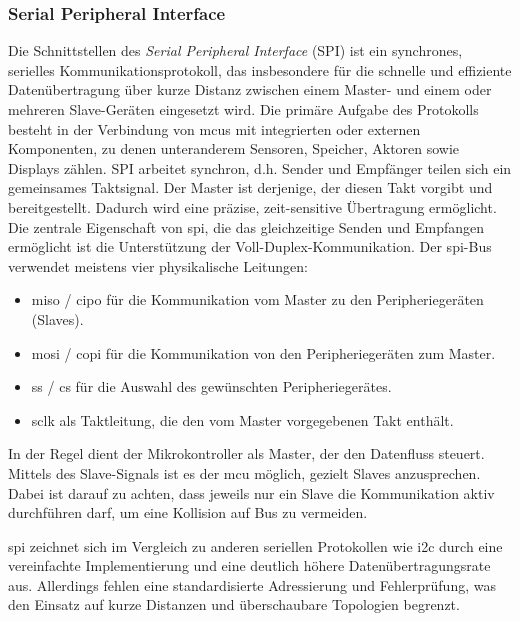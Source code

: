 \subsubsection*{Serial Peripheral Interface}
Die Schnittstellen des \emph{Serial Peripheral Interface} (SPI) ist ein synchrones, serielles Kommunikationsprotokoll, das insbesondere für die schnelle und effiziente Datenübertragung über kurze Distanz zwischen einem Master- und einem oder mehreren Slave-Geräten eingesetzt wird. 
Die primäre Aufgabe des Protokolls besteht in der Verbindung von \gls{mcu}s mit integrierten oder externen Komponenten, zu denen unteranderem  Sensoren, Speicher, Aktoren sowie Displays zählen.
SPI arbeitet synchron, d.h. Sender und Empfänger teilen sich ein gemeinsames Taktsignal.
Der Master ist derjenige, der diesen Takt vorgibt und bereitgestellt.
Dadurch wird eine präzise, zeit-sensitive Übertragung ermöglicht. 
Die zentrale Eigenschaft von \gls{spi}, die das gleichzeitige Senden und Empfangen ermöglicht ist die Unterstützung der Voll-Duplex-Kommunikation.
Der \gls{spi}-Bus verwendet meistens vier physikalische Leitungen:
\begin{itemize}
	\item \gls{miso} / \gls{cipo} für die Kommunikation vom Master zu den Peripheriegeräten (Slaves).
	\item \gls{mosi} / \gls{copi} für die Kommunikation von den Peripheriegeräten zum Master.
	\item \gls{ss} / \gls{cs} für die Auswahl des gewünschten Peripheriegerätes.
	\item \gls{sclk} als Taktleitung, die den vom Master vorgegebenen Takt enthält.
\end{itemize}

In der Regel dient der Mikrokontroller als Master, der den Datenfluss steuert.
Mittels des Slave-Signals ist es der \gls{mcu} möglich, gezielt Slaves anzusprechen.
Dabei ist darauf zu achten, dass jeweils nur ein Slave die Kommunikation aktiv durchführen darf, um eine Kollision auf Bus zu vermeiden.

\gls{spi} zeichnet sich im Vergleich zu anderen seriellen Protokollen wie \gls{i2c} durch eine vereinfachte Implementierung und eine deutlich höhere Datenübertragungsrate aus. 
Allerdings fehlen eine standardisierte Adressierung und Fehlerprüfung, was den Einsatz auf kurze Distanzen und überschaubare Topologien begrenzt. 


